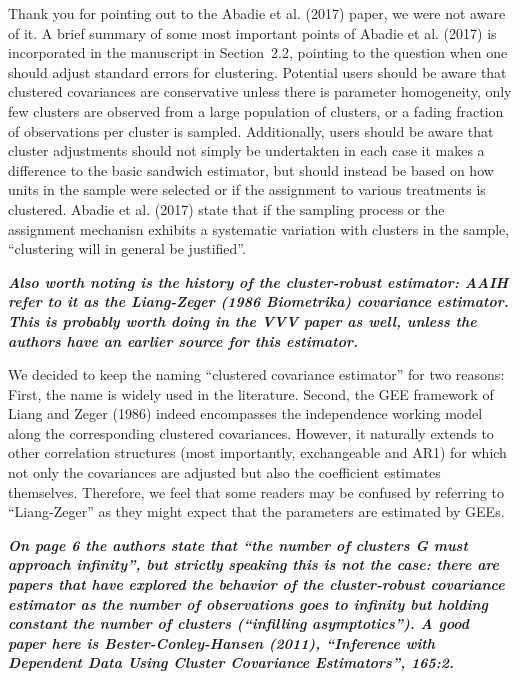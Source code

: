 \documentclass[10pt,a4paper]{article}
\begin{document}
\medskip

Thank you for pointing out to the Abadie et al. (2017) paper, we were not aware of it.
A brief summary of some most important points of Abadie et al. (2017) is incorporated in the manuscript in Section~2.2, pointing to the question when one should adjust standard errors for clustering.
Potential users should be aware that clustered covariances are conservative unless there is parameter homogeneity, only few clusters are observed from a large population of clusters, or a fading fraction of observations per cluster is sampled.
Additionally, users should be aware that cluster adjustments should not simply be
undertakten in each case it makes a difference to the basic sandwich estimator, but should instead be based on how units in the sample were selected or if the assignment to various treatments is clustered. Abadie et al.
(2017) state that if the sampling process or the assignment mechanisn exhibits a systematic
variation with clusters in the sample, ``clustering will in general be justified''.

\medskip

\textbf{\textit{Also worth noting is the history of the cluster-robust estimator: AAIH refer to it as the Liang-Zeger (1986 Biometrika) covariance estimator.  This is probably worth doing in the VVV paper as well, unless the authors have an earlier source for this estimator.
}}

\medskip

We decided to keep the naming ``clustered covariance estimator'' for two reasons:
First, the name is widely used in the literature.
Second, the GEE framework of Liang and Zeger (1986) indeed encompasses the independence
working model along the corresponding clustered covariances. However, it naturally extends
to other correlation structures (most importantly, exchangeable and AR1) for which not
only the covariances are adjusted but also the coefficient estimates themselves. Therefore,
we feel that some readers may be confused by referring to ``Liang-Zeger'' as they might
expect that the parameters are estimated by GEEs.

\medskip

\textbf{\textit{On page 6 the authors state that ``the number of clusters G must approach infinity'', but strictly speaking this is not the case: there are papers that have explored the behavior of the cluster-robust covariance estimator as the number of observations goes to infinity but holding constant the number of clusters (``infilling asymptotics'').  A good paper here is Bester-Conley-Hansen (2011), ``Inference with Dependent Data Using Cluster Covariance Estimators'', 165:2.
}}
\end{document}

